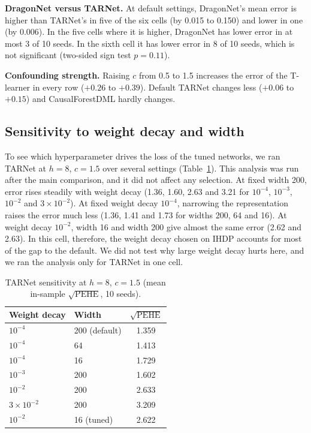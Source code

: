 \documentclass[10pt]{article}
\begin{document}
\textbf{DragonNet versus TARNet.} At default settings, DragonNet's mean error is higher than TARNet's in five of the six cells (by 0.015 to 0.150) and lower in one (by 0.006). In the five cells where it is higher, DragonNet has lower error in at most 3 of 10 seeds. In the sixth cell it has lower error in 8 of 10 seeds, which is not significant (two-sided sign test $p=0.11$).

\textbf{Confounding strength.} Raising $c$ from 0.5 to 1.5 increases the error of the T-learner in every row ($+0.26$ to $+0.39$). Default TARNet changes less ($+0.06$ to $+0.15$) and CausalForestDML hardly changes.

\subsection{Sensitivity to weight decay and width}

To see which hyperparameter drives the loss of the tuned networks, we ran TARNet at $h=8$, $c=1.5$ over several settings (Table~\ref{tab:sens}). This analysis was run after the main comparison, and it did not affect any selection. At fixed width 200, error rises steadily with weight decay (1.36, 1.60, 2.63 and 3.21 for $10^{-4}$, $10^{-3}$, $10^{-2}$ and $3\times10^{-2}$). At fixed weight decay $10^{-4}$, narrowing the representation raises the error much less (1.36, 1.41 and 1.73 for widths 200, 64 and 16). At weight decay $10^{-2}$, width 16 and width 200 give almost the same error (2.62 and 2.63). In this cell, therefore, the weight decay chosen on IHDP accounts for most of the gap to the default. We did not test why large weight decay hurts here, and we ran the analysis only for TARNet in one cell.

\begin{table}[t]
\centering
\small
\caption{TARNet sensitivity at $h=8$, $c=1.5$ (mean in-sample $\sqrt{\mathrm{PEHE}}$, 10 seeds).}
\label{tab:sens}
\begin{tabular}{llc}
\toprule
Weight decay & Width & $\sqrt{\mathrm{PEHE}}$ \\
\midrule
$10^{-4}$ & 200 (default) & 1.359 \\
$10^{-4}$ & 64 & 1.413 \\
$10^{-4}$ & 16 & 1.729 \\
$10^{-3}$ & 200 & 1.602 \\
$10^{-2}$ & 200 & 2.633 \\
$3\times10^{-2}$ & 200 & 3.209 \\
$10^{-2}$ & 16 (tuned) & 2.622 \\
\bottomrule
\end{tabular}
\end{table}
\end{document}
